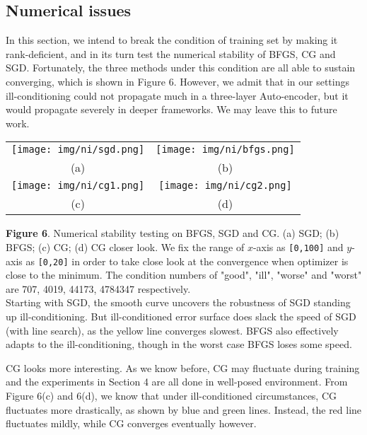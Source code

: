 \documentclass{article} %
\begin{document}
\subsection{Numerical issues} In this section, we intend to break the condition of training set by making it rank-deficient, and in its turn test the numerical stability of BFGS, CG and SGD. Fortunately, the three methods under this condition are all able to sustain converging, which is shown in Figure 6. However, we admit that in our settings ill-conditioning could not propagate much in a three-layer Auto-encoder, but it would propagate severely in deeper frameworks. We may leave this to future work.\\	
\begin{tabular}{cc}
    \texttt{[image: img/ni/sgd.png]}  & \texttt{[image: img/ni/bfgs.png]} \\
    (a) & (b) \\
    \texttt{[image: img/ni/cg1.png]}  & \texttt{[image: img/ni/cg2.png]} \\
    (c) & (d) \\
\end{tabular}
{\bf Figure 6}. Numerical stability testing on BFGS, SGD and CG. (a) SGD; (b) BFGS; (c) CG; (d) CG closer look. We fix the range of $x$-axis as \texttt{[0,100]} and $y$-axis as \texttt{[0,20]} in order to take close look at the convergence when optimizer is close to the minimum. The condition numbers of "good", "ill", "worse" and "worst" are 707, 4019, 44173, 4784347 respectively. \\

Starting with SGD, the smooth curve uncovers the robustness of SGD standing up ill-conditioning. But ill-conditioned error surface does slack the speed of SGD (with line search), as the yellow line converges slowest. BFGS also effectively adapts to the ill-conditioning, though in the worst case BFGS loses some speed.

CG looks more interesting. As we know before, CG may fluctuate during training and the experiments in Section 4 are all done in well-posed environment. From Figure 6(c) and 6(d), we know that under ill-conditioned circumstances, CG fluctuates more drastically, as shown by blue and green lines. Instead, the red line fluctuates mildly, while CG converges eventually however. 
\end{document}
